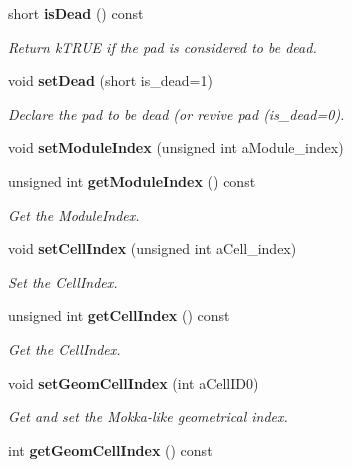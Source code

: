 \begin{DoxyCompactItemize}
\item 
short {\bf is\-Dead} () const \label{classCALICE_1_1NoiseParameter_aaad737204e2573e3fb934bb9ef373107}

\begin{DoxyCompactList}\small\item\em Return k\-T\-R\-U\-E if the pad is considered to be dead. \end{DoxyCompactList}\item 
void {\bf set\-Dead} (short is\-\_\-dead=1)
\begin{DoxyCompactList}\small\item\em Declare the pad to be dead (or revive pad (is\-\_\-dead=0). \end{DoxyCompactList}\item 
void {\bfseries set\-Module\-Index} (unsigned int a\-Module\-\_\-index)\label{classCALICE_1_1NoiseParameter_a4ec1782980dd013e8f361c32f9280fad}

\item 
unsigned int {\bf get\-Module\-Index} () const 
\begin{DoxyCompactList}\small\item\em Get the Module\-Index. \end{DoxyCompactList}\item 
void {\bf set\-Cell\-Index} (unsigned int a\-Cell\-\_\-index)\label{classCALICE_1_1NoiseParameter_a6de76912e4150b4ce0b63688be1de595}

\begin{DoxyCompactList}\small\item\em Set the Cell\-Index. \end{DoxyCompactList}\item 
unsigned int {\bf get\-Cell\-Index} () const 
\begin{DoxyCompactList}\small\item\em Get the Cell\-Index. \end{DoxyCompactList}\item 
void {\bf set\-Geom\-Cell\-Index} (int a\-Cell\-I\-D0)\label{classCALICE_1_1NoiseParameter_a7a85f45d0e5d9bfcd07574f0ffa4ce2d}

\begin{DoxyCompactList}\small\item\em Get and set the Mokka-\/like geometrical index. \end{DoxyCompactList}\item 
int {\bfseries get\-Geom\-Cell\-Index} () const \label{classCALICE_1_1NoiseParameter_a2e5ecdf5faaddbdf33001f4ca61c5b62}


\end{DoxyCompactItemize}

